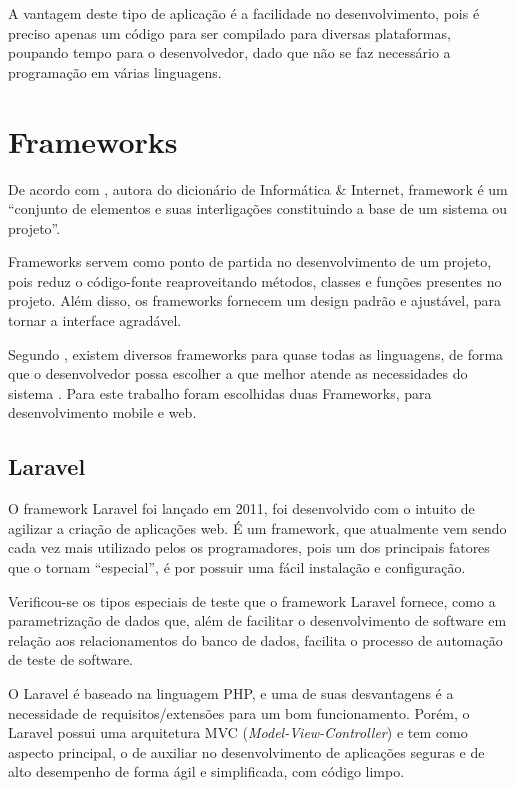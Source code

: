 		A vantagem deste tipo de aplicação é a facilidade no desenvolvimento, pois é preciso apenas um código para ser compilado para diversas plataformas, poupando tempo para o  desenvolvedor, dado que não se faz necessário a programação em várias linguagens.
	
\section{Frameworks}
	
	De acordo com , autora do dicionário de Informática \& Internet, framework é um “conjunto de elementos e suas interligações constituindo a base de um sistema ou projeto”.
	
	Frameworks servem como ponto de partida no desenvolvimento de um projeto, pois reduz o código-fonte reaproveitando métodos, classes e funções presentes no projeto. Além disso, os frameworks fornecem um design padrão e ajustável, para tornar a interface agradável.\cite{gabardo2017laravel}
	
	Segundo , existem diversos frameworks para quase todas as linguagens, de forma que o desenvolvedor possa escolher a que melhor atende as necessidades do sistema . Para este trabalho foram escolhidas duas Frameworks, para desenvolvimento mobile e web.
	

	\subsection{Laravel}
	
		O framework Laravel foi lançado em 2011, foi desenvolvido com o intuito de agilizar a criação de aplicações web. É um framework, que atualmente vem sendo cada vez mais utilizado pelos os programadores, pois um dos principais fatores que o tornam “especial”, é por possuir uma fácil instalação e configuração. 
		
		\begin{citacao}
			Verificou-se os tipos especiais de teste que o framework Laravel fornece, como a parametrização de dados que, além de facilitar o desenvolvimento de software em relação aos relacionamentos do banco de dados, facilita o processo de automação de teste de software.\cite{pelizza2018estudo}
		\end{citacao}
		
		
		O Laravel é baseado na linguagem PHP, e uma de suas desvantagens é a necessidade de requisitos/extensões para um bom funcionamento. Porém, o Laravel possui uma arquitetura MVC (\textit{Model-View-Controller}) e tem como aspecto principal, o de auxiliar no desenvolvimento de aplicações seguras e de alto desempenho de forma ágil e simplificada, com código limpo.\cite{pelizza2018estudo}
	
